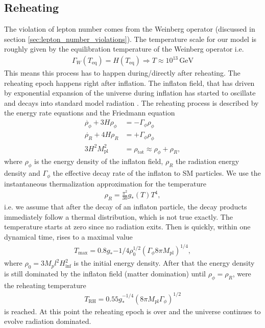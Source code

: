 \documentclass[13pt,a4paper,titlepage]{article}
\begin{document}
\subsection{Reheating}
\label{sec:reheating}
The violation of lepton number comes from the Weinberg operator (discussed in section \ref{sec:lepton_number_violations}).
The temperature scale for our model is roughly given by the equilibration temperature of the Weinberg operator i.e.
\begin{align}
    \Gamma_W(T_\mathrm{eq}) = H(T_\mathrm{eq}) \Rightarrow T \approx 10^{13} \, \mathrm{GeV}
\end{align}
This means this process has to happen during/directly after reheating. The reheating epoch happens right after inflation. The inflaton field, that has driven by exponential expansion of the universe during inflation has started to oscillate and decays into standard model radiation  \cite[sec. 8.3]{the_early_universe_kolb_and_turner}.
The reheating process is described by the energy rate equations and the Friedmann equation \cite[eq. 8.29, 8.31]{the_early_universe_kolb_and_turner}
\begin{align}
    \label{eq:reheating_equations}
    \dot{\rho_\phi} + 3 H \rho_\phi &= - \Gamma_\phi \rho_\phi \\
    \dot{\rho_R} + 4 H \rho_R &= + \Gamma_\phi \rho_\phi \\
    3 H^2 M_\mathrm{pl}^2 &= \rho_\mathrm{tot} \approx \rho_\phi + \rho_R,
\end{align}
where $\rho_\phi$ is the energy density of the inflaton field, $\rho_R$ the radiation energy density and $\Gamma_\phi$ the effective decay rate of the inflaton to SM particles.
We use the instantaneous thermalization approximation for the temperature
\begin{align}
    \rho_R = \frac{\pi^2}{30} g_{*}(T) T^4,
\end{align}
i.e. we assume that after the decay of an inflaton particle, the decay products immediately follow a thermal distribution, which is not true exactly.
The temperature starts at zero since no radiation exits. Then is quickly, within one dynamical time, rises to a maximal
value \cite[eq. 8.33]{the_early_universe_kolb_and_turner}
\begin{align}
    T_\mathrm{max} = 0.8 g_*{-1/4} \rho_0^{1/2} (\Gamma_\phi 8 \pi M_\mathrm{pl})^{1/4},
\end{align}
where $\rho_0 = 3 M_pl^2 H_\mathrm{inf}^2$ is the initial energy density.
After that the energy density is still dominated by the inflaton field (matter domination) until
$\rho_\phi = \rho_R$, were the reheating temperature \cite[eq. 8.34]{the_early_universe_kolb_and_turner}
\begin{align}
    T_\mathrm{RH} = 0.55 g_*^{-1/4} (8 \pi M_\mathrm{pl} \Gamma_\phi)^{1/2}
\end{align}
is reached. At this point the reheating epoch is over and the universe continues to evolve radiation dominated.
\end{document}
